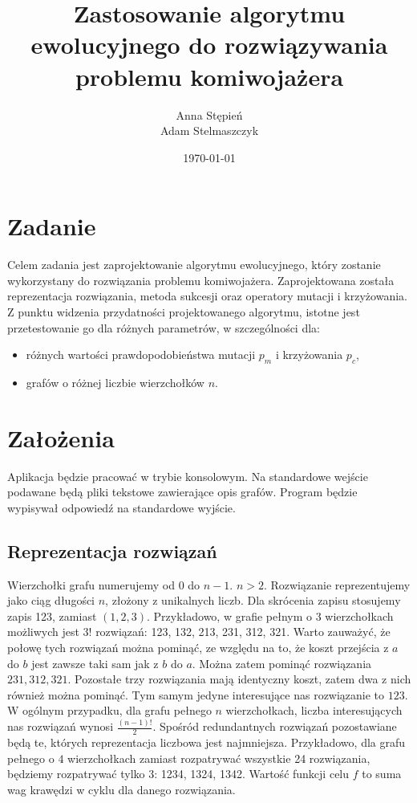 \documentclass[12pt, a4paper]{article}
\title{\textbf{Zastosowanie algorytmu ewolucyjnego do rozwiązywania problemu komiwojażera}}
\author{Anna Stępień \\ Adam Stelmaszczyk}
\date{\today}
\begin{document}
\maketitle

\section{Zadanie}
Celem zadania jest zaprojektowanie algorytmu ewolucyjnego, który zostanie wykorzystany do rozwiązania problemu komiwojażera.
Zaprojektowana została reprezentacja rozwiązania, metoda sukcesji oraz operatory mutacji i krzyżowania. 
Z punktu widzenia przydatności projektowanego algorytmu, istotne jest przetestowanie go dla różnych parametrów, w szczególności dla:
\begin{itemize}
	\item różnych wartości prawdopodobieństwa mutacji $p_m$ i krzyżowania $p_c$,
	\item grafów o różnej liczbie wierzchołków $n$.
\end{itemize}

\section{Założenia}
Aplikacja będzie pracować w trybie konsolowym. Na standardowe wejście podawane będą pliki tekstowe zawierające opis grafów.
Program będzie wypisywał odpowiedź na standardowe wyjście.

\subsection{Reprezentacja rozwiązań}

Wierzchołki grafu numerujemy od 0 do $n - 1$. $n > 2$. Rozwiązanie reprezentujemy jako ciąg długości $n$, złożony z unikalnych liczb. 
Dla skrócenia zapisu stosujemy zapis 123, zamiast $(1,2,3)$. Przykładowo, w grafie pełnym o 3 wierzchołkach możliwych jest $3!$ rozwiązań: 123, 132, 213, 231, 312, 321.
Warto zauważyć, że połowę tych rozwiązań można pominąć, ze względu na to, że koszt przejścia z $a$ do $b$ jest zawsze 
taki sam jak z $b$ do $a$. Można zatem pominąć rozwiązania $231, 312, 321$. Pozostałe trzy rozwiązania mają identyczny koszt,
zatem dwa z nich również można pominąć. Tym samym jedyne interesujące nas rozwiązanie to $123$.
W ogólnym przypadku, dla grafu pełnego $n$ wierzchołkach, liczba interesujących nas rozwiązań wynosi $\frac{(n-1)!}{2}$. Spośród redundantnych rozwiązań pozostawiane będą te,
których reprezentacja liczbowa jest najmniejsza. Przykładowo, dla grafu pełnego o $4$ wierzchołkach zamiast rozpatrywać wszystkie
24 rozwiązania, będziemy rozpatrywać tylko 3: 1234, 1324, 1342. 
Wartość funkcji celu $f$ to suma wag krawędzi w cyklu dla danego rozwiązania.
\end{document}
